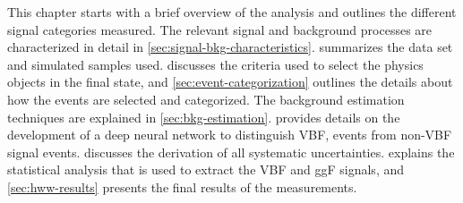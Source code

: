 This chapter starts with a brief overview of the analysis and outlines the different signal categories measured. 
The relevant signal and background processes are characterized in detail in \cref{sec:signal-bkg-characteristics}. 
 summarizes the data set and simulated samples used.
 discusses the criteria used to select the physics objects in the final state, and \cref{sec:event-categorization} outlines the details about how the events are selected and categorized. 
The background estimation techniques are explained in \cref{sec:bkg-estimation}. 
 provides details on the development of a deep neural network to distinguish VBF, \HWW events from non-VBF signal events. 
 discusses the derivation of all systematic uncertainties. 
 explains the statistical analysis that is used to extract the VBF and ggF signals, and \cref{sec:hww-results} presents the final results of the measurements.
